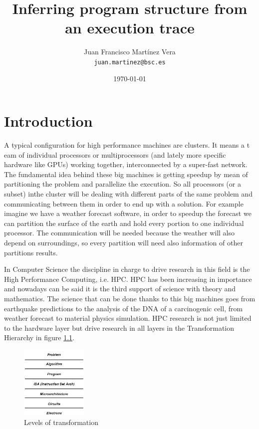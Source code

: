 \documentclass[10pt]{report}
\title{
  {\Huge Inferring program structure from an execution trace}
}
\author{
  {Juan Francisco Martínez Vera}\\
  {\tt juan.martinez@bsc.es}
}
\date{\today}
\begin{document}
\maketitle
\tableofcontents

\chapter{Introduction}
A typical configuration for high performance machines are clusters. It means a t
eam of individual processors or multiprocessors (and lately more specific 
hardware like GPUs) working together, interconnected by a super-fast network. 
The fundamental idea behind these big machines is getting speedup by mean of
partitioning the problem and parallelize the execution. So all processors (or a 
subset) inthe cluster will be dealing with different parts of the same problem 
and communicating between them in order to end up with a solution. For example 
imagine we have a weather forecast software, in order to speedup the forecast 
we can partition the surface of the earth and hold every portion to one individual
processor. The communication will be needed because the weather will also depend 
on surroundings, so every partition will need also information of other partitions 
results.

In Computer Science the discipline in charge to drive research in this field is 
the High Performance Computing, i.e. HPC. HPC has been increasing in importance 
and nowadays can be said it is the third support of science with theory and 
mathematics. The science that can be done thanks to this big machines goes from 
earthquake predictions to the analysis of the DNA of a carcinogenic cell, from
weather forecast to material physics simulation. HPC research is not just limited
to the hardware layer but drive research in all layers in the Transformation 
Hierarchy\cite{transformationHierarchy} in figure \ref{transformationHierarchyImg}.

\begin{figure}
  \caption{Levels of transformation}
  \label{transformationHierarchyImg}
  \centering
    \includegraphics[width=120px]{transformationhierarchy.png}
\end{figure}
\end{document}
